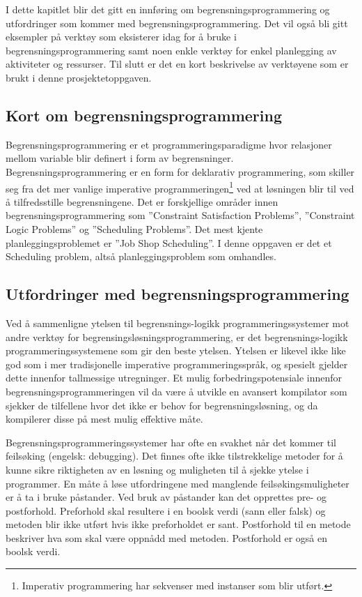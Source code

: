 I dette kapitlet blir det gitt en innføring om begrensningsprogrammering og utfordringer som kommer med begrensningsprogrammering. Det vil også bli gitt eksempler på verktøy som eksisterer idag for å bruke i begrensningsprogrammering samt noen enkle verktøy for enkel planlegging av aktiviteter og ressurser. Til slutt er det en kort beskrivelse av verktøyene som er brukt i denne prosjektetoppgaven.

\subsection{Kort om begrensningsprogrammering}
Begrensningsprogrammering er et programmeringsparadigme hvor relasjoner mellom variable blir definert i form av begrensninger. Begrensningsprogrammering er en form for deklarativ programmering, som skiller seg fra det mer vanlige imperative programmeringen\footnote{Imperativ programmering har sekvenser med instanser som blir utført.} ved at løsningen blir til ved å tilfredsstille begrensningene. Det er forskjellige områder innen begrensningsprogrammering som ''Constraint Satisfaction Problems'', ''Constraint Logic Problems'' og ''Scheduling Problems''\cite{cpwikipedia}. Det mest kjente planleggingsproblemet er ''Job Shop Scheduling''. I denne oppgaven er det et Scheduling problem, altså planleggingsproblem som omhandles.

\subsection{Utfordringer med begrensningsprogrammering}
Ved å sammenligne ytelsen til begrensnings-logikk programmeringssystemer mot andre verktøy for begrensingsløsningsprogrammering, er det begrensnings-logikk programmeringssystemene som gir den beste ytelsen. Ytelsen er likevel ikke like god som i mer tradisjonelle imperative programmeringsspråk, og spesielt gjelder dette innenfor tallmessige utregninger. Et mulig forbedringspotensiale innenfor begrensningsprogrammeringen vil da være å utvikle en avansert kompilator som sjekker de tilfellene hvor det ikke er behov for begrensningsløsning, og da kompilerer disse på mest mulig effektive måte\cite{challengesManuel}.

Begrensningsprogrammeringssystemer har ofte en svakhet når det kommer til feilsøking (engelsk: debugging). Det finnes ofte ikke tilstrekkelige metoder for å kunne sikre riktigheten av en løsning og muligheten til å sjekke ytelse i programmer. En måte å løse utfordringene med manglende feilsøkingsmuligheter er å ta i bruke påstander. Ved bruk av påstander kan det opprettes pre- og postforhold. Preforhold skal resultere i en boolsk verdi (sann eller falsk) og metoden blir ikke utført hvis ikke preforholdet er sant. Postforhold til en metode beskriver hva som skal være oppnådd med metoden. Postforhold er også en boolsk verdi\cite{challengesManuel}.

